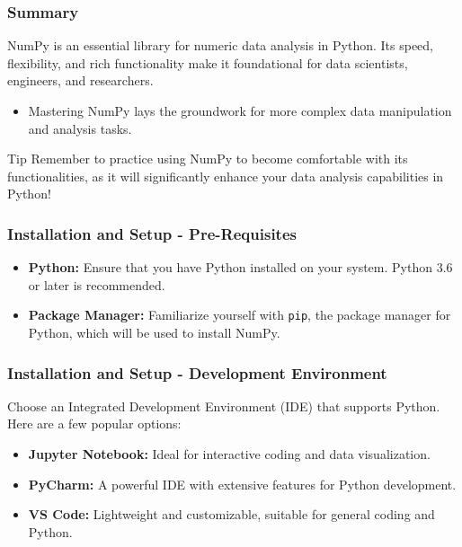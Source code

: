 \documentclass{beamer}
\begin{document}
\begin{frame}[fragile]
    \frametitle{Summary}
    \begin{block}{}
        NumPy is an essential library for numeric data analysis in Python. Its speed, flexibility, and rich functionality make it foundational for data scientists, engineers, and researchers.
        \begin{itemize}
            \item Mastering NumPy lays the groundwork for more complex data manipulation and analysis tasks.
        \end{itemize}
    \end{block}
    \begin{block}{Tip}
        Remember to practice using NumPy to become comfortable with its functionalities, as it will significantly enhance your data analysis capabilities in Python!
    \end{block}
\end{frame}

\begin{frame}[fragile]
    \frametitle{Installation and Setup - Pre-Requisites}
    \begin{itemize}
        \item \textbf{Python:} Ensure that you have Python installed on your system. Python 3.6 or later is recommended.
        \item \textbf{Package Manager:} Familiarize yourself with \texttt{pip}, the package manager for Python, which will be used to install NumPy.
    \end{itemize}
\end{frame}

\begin{frame}[fragile]
    \frametitle{Installation and Setup - Development Environment}
    Choose an Integrated Development Environment (IDE) that supports Python. Here are a few popular options:
    \begin{itemize}
        \item \textbf{Jupyter Notebook:} Ideal for interactive coding and data visualization.
        \item \textbf{PyCharm:} A powerful IDE with extensive features for Python development.
        \item \textbf{VS Code:} Lightweight and customizable, suitable for general coding and Python.
    \end{itemize}
\end{frame}
\end{document}
